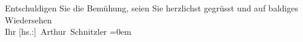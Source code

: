 \pstart
           Entschuldigen Sie die Bemühung, seien Sie herzlichst gegrüsst und auf baldiges
               Wiedersehen{\\[\baselineskip]}Ihr \spacefill\mbox{{[}hs.:{]} Arthur Schnitzler}\pend
           \leftskip=0em{}\endnumbering{}  \newcommand{\dateiname}{L03776}\newcommand{\titel}{Arthur Schnitzler an Stefan Zweig, 9. 11. 1914}\newcommand{\editorInnen}{Selma Jahnke und Martin Anton Müller}
